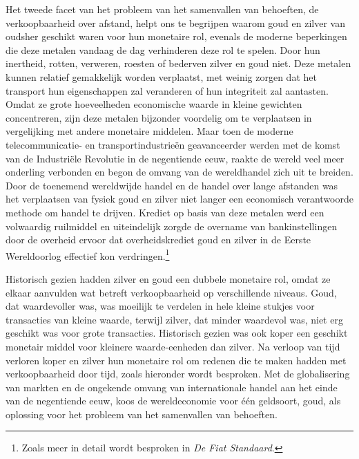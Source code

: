 Het tweede facet van het probleem van het samenvallen van behoeften, de verkoopbaarheid over afstand, helpt ons te begrijpen waarom goud en zilver van oudsher geschikt waren voor hun monetaire rol, evenals de moderne beperkingen die deze metalen vandaag de dag verhinderen deze rol te spelen. Door hun inertheid, rotten, verweren, roesten of bederven zilver en goud niet. Deze metalen kunnen relatief gemakkelijk worden verplaatst, met weinig zorgen dat het transport hun eigenschappen zal veranderen of hun integriteit zal aantasten. Omdat ze grote hoeveelheden economische waarde in kleine gewichten concentreren, zijn deze metalen bijzonder voordelig om te verplaatsen in vergelijking met andere monetaire middelen. Maar toen de moderne telecommunicatie- en transportindustrieën geavanceerder werden met de komst van de Industriële Revolutie in de negentiende eeuw, raakte de wereld veel meer onderling verbonden en begon de omvang van de wereldhandel zich uit te breiden. Door de toenemend wereldwijde handel en de handel over lange afstanden was het verplaatsen van fysiek goud en zilver niet langer een economisch verantwoorde methode om handel te drijven. Krediet op basis van deze metalen werd een volwaardig ruilmiddel en uiteindelijk zorgde de overname van bankinstellingen door de overheid ervoor dat overheidskrediet goud en zilver in de Eerste Wereldoorlog effectief kon verdringen.\footnote{Zoals meer in detail wordt besproken in \emph{De Fiat Standaard}.}

Historisch gezien hadden zilver en goud een dubbele monetaire rol, omdat ze elkaar aanvulden wat betreft verkoopbaarheid op verschillende niveaus. Goud, dat waardevoller was, was moeilijk te verdelen in hele kleine stukjes voor transacties van kleine waarde, terwijl zilver, dat minder waardevol was, niet erg geschikt was voor grote transacties. Historisch gezien was ook koper een geschikt monetair middel voor kleinere waarde-eenheden dan zilver. Na verloop van tijd verloren koper en zilver hun monetaire rol om redenen die te maken hadden met verkoopbaarheid door tijd, zoals hieronder wordt besproken. Met de globalisering van markten en de ongekende omvang van internationale handel aan het einde van de negentiende eeuw, koos de wereldeconomie voor één geldsoort, goud, als oplossing voor het probleem van het samenvallen van behoeften.

